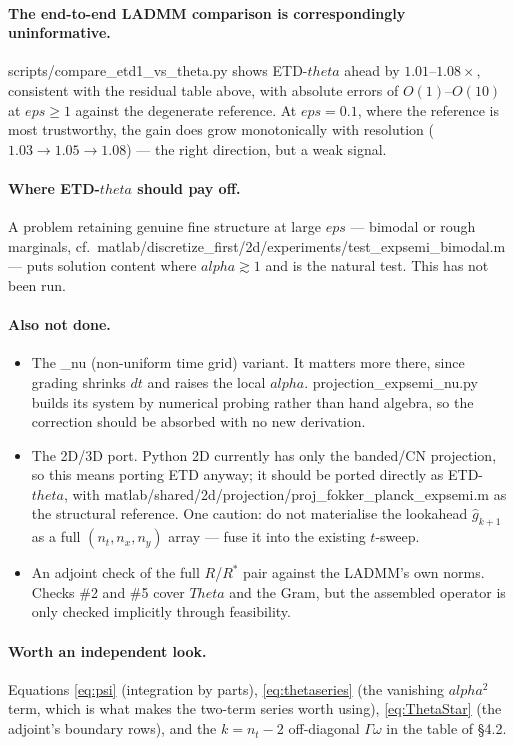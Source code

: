 \documentclass[11pt]{article}
\newcommand{\eps}{\varepsilon}
\newcommand{\dt}{\Delta t}
\newcommand{\dx}{\Delta x}
\newcommand{\code}[1]{\texttt{#1}}
\def\theta{theta}\def\Theta{Theta}\def\alpha{alpha}\def\rho{rho}%
\def\eps{eps}\def\dt{dt}\def\dx{dx}\def\code#1{#1}%
\begin{document}
\paragraph{The end-to-end LADMM comparison is correspondingly uninformative.}
\code{scripts/compare\_etd1\_vs\_theta.py} shows ETD-$\theta$ ahead by
$1.01$--$1.08\times$, consistent with the residual table above, with absolute
errors of $O(1)$--$O(10)$ at $\eps\ge1$ against the degenerate reference. At
$\eps=0.1$, where the reference is most trustworthy, the gain does grow
monotonically with resolution ($1.03\to1.05\to1.08$) --- the right direction,
but a weak signal.

\paragraph{Where ETD-$\theta$ should pay off.} A problem retaining genuine
fine structure at large $\eps$ --- bimodal or rough marginals, cf.\
\code{matlab/discretize\_first/2d/experiments/test\_expsemi\_bimodal.m} ---
puts solution content where $\alpha\gtrsim1$ and is the natural test. This has
not been run.

\paragraph{Also not done.}
\begin{itemize}
  \item The \code{\_nu} (non-uniform time grid) variant. It matters more there, since
        grading shrinks $\dt$ and raises the local $\alpha$. \code{projection\_expsemi\_nu.py}
        builds its system by numerical probing rather than hand algebra, so the
        correction should be absorbed with no new derivation.
  \item The 2D/3D port. Python 2D currently has only the banded/CN projection, so this
        means porting ETD anyway; it should be ported directly as ETD-$\theta$, with
        \code{matlab/shared/2d/projection/proj\_fokker\_planck\_expsemi.m} as the
        structural reference. One caution: do not materialise the lookahead
        $\hat g_{k+1}$ as a full $(n_t,n_x,n_y)$ array --- fuse it into the existing
        $t$-sweep.
  \item An adjoint check of the full $R$/$R^*$ pair against the LADMM's own norms. Checks
        \#2 and \#5 cover $\Theta$ and the Gram, but the assembled operator is only
        checked implicitly through feasibility.
\end{itemize}

\paragraph{Worth an independent look.} Equations \eqref{eq:psi} (integration by parts),
\eqref{eq:thetaseries} (the vanishing $\alpha^2$ term, which is what makes the two-term
series worth using), \eqref{eq:ThetaStar} (the adjoint's boundary rows), and the
$k=n_t-2$ off-diagonal $\Gamma\omega$ in the table of \S4.2.
\end{document}
